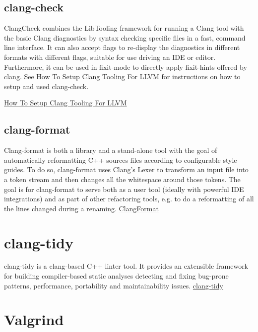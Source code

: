 \subsection{clang-check}%
\label{sub:clang_check}
ClangCheck combines the LibTooling framework for running a Clang tool with the basic Clang diagnostics by syntax checking specific files in a fast, command line interface. It can also accept flags to re-display the diagnostics in different formats with different flags, suitable for use driving an IDE or editor. Furthermore, it can be used in fixit-mode to directly apply fixit-hints offered by clang. See How To Setup Clang Tooling For LLVM for instructions on how to setup and used clang-check.


\href{https://clang.llvm.org/docs/HowToSetupToolingForLLVM.html}{How To Setup Clang Tooling For LLVM}

\subsection{clang-format}%
\label{sub:clang_format}
Clang-format is both a library and a stand-alone tool with the goal of automatically reformatting C++ sources files according to configurable style guides. To do so, clang-format uses Clang’s Lexer to transform an input file into a token stream and then changes all the whitespace around those tokens. The goal is for clang-format to serve both as a user tool (ideally with powerful IDE integrations) and as part of other refactoring tools, e.g. to do a reformatting of all the lines changed during a renaming.
\href{https://clang.llvm.org/docs/ClangFormat.html}{ClangFormat}


\section{clang-tidy}%
\label{sec:clang_tidy}
clang-tidy is a clang-based C++ linter tool. It provides an extensible framework for building compiler-based static analyses detecting and fixing bug-prone patterns, performance, portability and maintainability issues.
\href{https://clang.llvm.org/extra/clang-tidy/\#id1} {clang-tidy}


\section{Valgrind}


